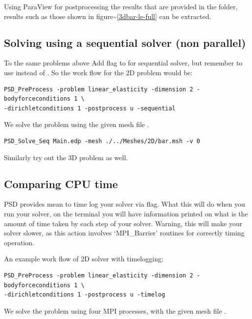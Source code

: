 Using ParaView for postprocessing the results that are provided in the
 folder, results such as those shown in
figure\textasciitilde{}\ref{3dbar-le-full} can be extracted.

\subsection{Solving using a sequential solver (non parallel)}

To the same problems above Add  flag to
 for sequential solver, but remember to use
 instead of . So the work flow for
the 2D problem would be:

\begin{lstlisting}[style=BashInputStyle]
PSD_PreProcess -problem linear_elasticity -dimension 2 -bodyforceconditions 1 \
-dirichletconditions 1 -postprocess u -sequential
\end{lstlisting}

We solve the problem using the given mesh file .

\begin{lstlisting}[style=BashInputStyle]
PSD_Solve_Seq Main.edp -mesh ./../Meshes/2D/bar.msh -v 0
\end{lstlisting}

Similarly try out the 3D problem as well.

\subsection{Comparing CPU time}

PSD provides mean to time log your solver via  flag. What
this will do when you run your solver, on the terminal you will have
information printed on what is the amount of time taken by each step of
your solver. Warning, this will make your solver slower, as this action
involves `MPI\_Barrier' routines for correctly timing operation.

An example work flow of 2D solver with timelogging:

\begin{lstlisting}[style=BashInputStyle]
PSD_PreProcess -problem linear_elasticity -dimension 2 -bodyforceconditions 1 \
-dirichletconditions 1 -postprocess u -timelog
\end{lstlisting}

We solve the problem using four MPI processes, with the given mesh file
.

